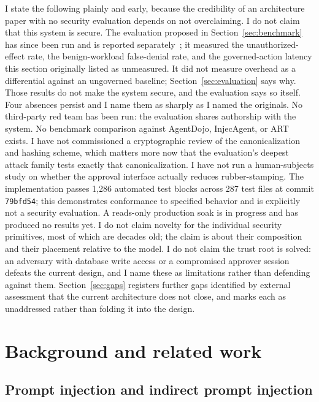 \documentclass[11pt,letterpaper]{article}
\begin{document}
I state the following plainly and early, because the credibility of an architecture paper with no security evaluation depends on not overclaiming. I do not claim that this system is secure. The evaluation proposed in Section~\ref{sec:benchmark} has since been run and is reported separately~\cite{croft2026eval}; it measured the unauthorized-effect rate, the benign-workload false-denial rate, and the governed-action latency this section originally listed as unmeasured. It did not measure overhead as a differential against an ungoverned baseline; Section~\ref{sec:evaluation} says why. Those results do not make the system secure, and the evaluation says so itself. Four absences persist and I name them as sharply as I named the originals. No third-party red team has been run: the evaluation shares authorship with the system. No benchmark comparison against AgentDojo, InjecAgent, or ART exists. I have not commissioned a cryptographic review of the canonicalization and hashing scheme, which matters more now that the evaluation's deepest attack family tests exactly that canonicalization. I have not run a human-subjects study on whether the approval interface actually reduces rubber-stamping. The implementation passes 1,286 automated test blocks across 287 test files at commit \texttt{79bfd54}; this demonstrates conformance to specified behavior and is explicitly not a security evaluation. A reads-only production soak is in progress and has produced no results yet. I do not claim novelty for the individual security primitives, most of which are decades old; the claim is about their composition and their placement relative to the model. I do not claim the trust root is solved: an adversary with database write access or a compromised approver session defeats the current design, and I name these as limitations rather than defending against them. Section~\ref{sec:gaps} registers further gaps identified by external assessment that the current architecture does not close, and marks each as unaddressed rather than folding it into the design.

\section{Background and related work}\label{sec:related}

\subsection{Prompt injection and indirect prompt injection}\label{sec:related-injection}
\end{document}
